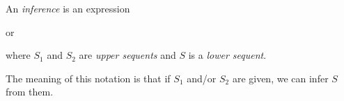 \documentclass[11pt,a4paper]{article}
\begin{document}
\begin{definition}%
    \label{def:inference}
    An \emph{inference} is an expression
    \begin{center}
    \begin{prooftree}
    \end{prooftree}
    \quad
    or
    \quad
    \begin{prooftree}
    \end{prooftree}
    \end{center}
    where \(S_1\) and \(S_2\) are \emph{upper sequents} and \(S\) is a \emph{lower sequent}.
\end{definition}

The meaning of this notation is that if \(S_1\) and/or \(S_2\) are given,
we can infer \(S\) from them.
\end{document}
